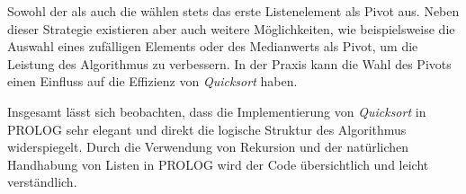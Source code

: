 Sowohl der  als auch die  wählen stets das erste Listenelement als Pivot aus. Neben dieser Strategie existieren aber auch weitere Möglichkeiten, wie beispielsweise die Auswahl eines zufälligen Elements oder des Medianwerts als Pivot, um die Leistung des Algorithmus zu verbessern. In der Praxis kann die Wahl des Pivots einen Einfluss auf die Effizienz von \textit{Quicksort} haben.

Insgesamt lässt sich beobachten, dass die Implementierung von \textit{Quicksort} in PROLOG sehr elegant und direkt die logische Struktur des Algorithmus widerspiegelt. Durch die Verwendung von Rekursion und der natürlichen Handhabung von Listen in PROLOG wird der Code übersichtlich und leicht verständlich.